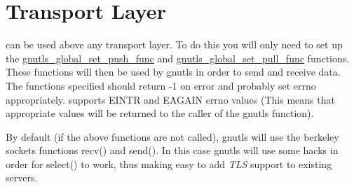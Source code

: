 \section{Transport Layer}
\par
\gnutls can be used above any transport layer. To do this you will only 
need to set up the 
\hyperref{gnutls\_global\_set\_push\_func()}{gnutls\_global\_set\_push\_func() (see Section }{
for more information)}{gnutls_global_set_push_func} and
\hyperref{gnutls\_global\_set\_pull\_func()}{gnutls\_global\_set\_pull\_func() (see Section }{
for more information)}{gnutls_global_set_pull_func}
functions. These functions will then be used by gnutls in order to send and receive data.
The functions specified should return -1 on error and probably set errno appropriately.
\gnutls supports EINTR and EAGAIN errno values (This means that appropriate
values will be returned to the caller of the gnutls function).
\par
By default (if the above functions are not called), gnutls will use
the berkeley sockets functions recv() and send(). In this case
gnutls will use some hacks in order for select() to work, thus
making easy to add \emph{TLS} support to existing servers.


